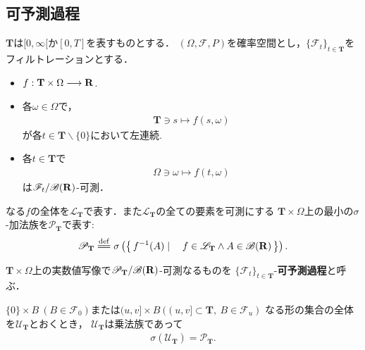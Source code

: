 \subsection{可予測過程}
	$\mathbf{T}$は$[0,\infty[$か$[0,T]$を表すものとする．
	$(\Omega, \mathscr{F}, P)$を確率空間とし，$\{\mathscr{F}_t\}_{t \in \mathbf{T}}$をフィルトレーションとする．
	
	\begin{itemize}
		\item $f:\mathbf{T} \times \Omega \longrightarrow \mathbf{R}$.
		
		\item 各$\omega \in \Omega$で，
			\begin{align}
				\mathbf{T} \ni s \longmapsto f(s,\omega)
			\end{align}
			が各$t \in \mathbf{T} \backslash \{0\}$において左連続.
			
		\item 各$t \in \mathbf{T}$で
			\begin{align}
				\Omega \ni \omega \longmapsto f(t,\omega)
			\end{align}
			は$\mathscr{F}_t/\mathscr{B}(\mathbf{R})$-可測．
	\end{itemize}
	
	なる$f$の全体を$\mathscr{L}_{\mathbf{T}}$で表す．また$\mathscr{L}_{\mathbf{T}}$の全ての要素を可測にする
	$\mathbf{T} \times \Omega$上の最小の$\sigma$-加法族を$\mathscr{P}_{\mathbf{T}}$で表す:
	\begin{align}
		\mathscr{P}_{\mathbf{T}} \defeq 
		\sigma\left(\Set{f^{-1}(A)}{f \in \mathscr{L}_{\mathbf{T}} \wedge A \in \borel{\R}}\right).
	\end{align}
	
	$\mathbf{T} \times \Omega$上の実数値写像で$\mathscr{P}_{\mathbf{T}}/\mathscr{B}(\mathbf{R})$-可測なるものを
	$\{\mathscr{F}_t\}_{t \in \mathbf{T}}$-{\bf 可予測過程}と呼ぶ．
	
	\begin{screen}
		\begin{thm}\label{thm:pi_system_generating_predictable_sets}
			$\{0\} \times B\ (B \in \mathscr{F}_0)$または$(u,v] \times B\ ((u,v] \subset \mathbf{T},\ B \in \mathscr{F}_u)$
			なる形の集合の全体を$\mathscr{U}_{\mathbf{T}}$とおくとき，
			$\mathscr{U}_{\mathbf{T}}$は乗法族であって
			\begin{align}
				\sigma\left(\mathscr{U}_{\mathbf{T}}\right) = \mathscr{P}_{\mathbf{T}}.
			\end{align}
		\end{thm}
	\end{screen}
	
